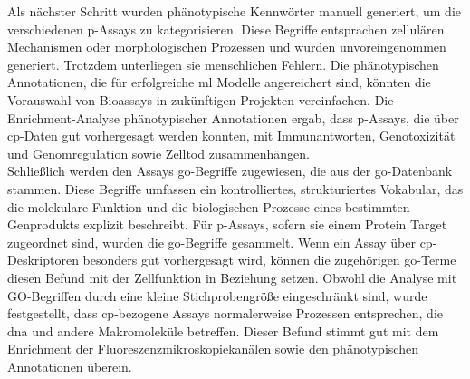 Als nächster Schritt wurden phänotypische Kennw\"orter manuell generiert, um die verschiedenen \acl{p}-Assays zu kategorisieren. Diese Begriffe entsprachen zellulären Mechanismen oder morphologischen Prozessen und wurden unvoreingenommen generiert. Trotzdem unterliegen sie menschlichen Fehlern. Die phänotypischen Annotationen, die für erfolgreiche \ac{ml} Modelle angereichert sind, könnten die Vorauswahl von Bioassays in zukünftigen Projekten vereinfachen. Die Enrichment-Analyse phänotypischer Annotationen ergab, dass \acl{p}-Assays, die über \ac{cp}-Daten gut vorhergesagt werden konnten, mit Immunantworten, Genotoxizität und Genomregulation sowie Zelltod zusammenhängen.\\
Schließlich werden den Assays \ac{go}-Begriffe zugewiesen, die aus der \ac{go}-Datenbank stammen. \cite{Ashburner2000, Carbon2020} Diese Begriffe umfassen ein kontrolliertes, strukturiertes Vokabular, das die molekulare Funktion und die biologischen Prozesse eines bestimmten Genprodukts explizit beschreibt. Für \acl{p}-Assays, sofern sie einem Protein Target zugeordnet sind, wurden die \ac{go}-Begriffe gesammelt. Wenn ein Assay über \ac{cp}-Deskriptoren besonders gut vorhergesagt wird, können die zugehörigen \ac{go}-Terme diesen Befund mit der Zellfunktion in Beziehung setzen. Obwohl die Analyse mit GO-Begriffen durch eine kleine Stichprobengröße eingeschr\"ankt sind, wurde festgestellt, dass \ac{cp}-bezogene Assays normalerweise Prozessen entsprechen, die \ac{dna} und andere Makromoleküle betreffen. Dieser Befund stimmt gut mit dem Enrichment der Fluoreszenzmikroskopiekanälen sowie den phänotypischen Annotationen überein.
